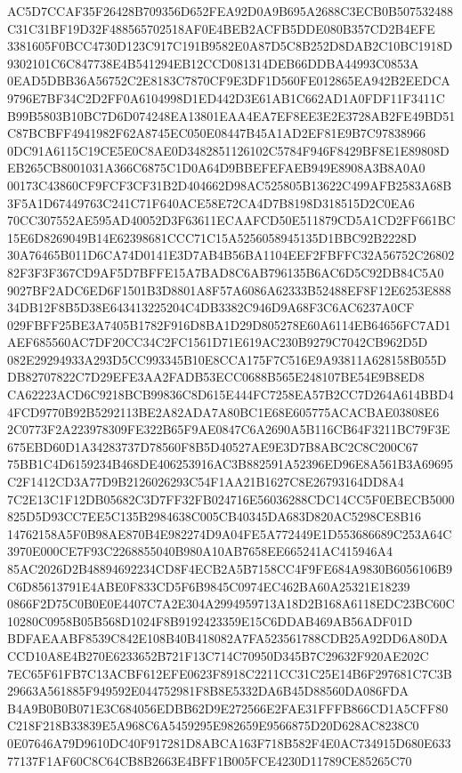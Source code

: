 \documentclass[UTF8,fontset=fandol,zihao=-4,a4paper]{ctexart}
\begin{document}
{{AC5D7CCAF35F26428B709356D652FEA92D0A9B695A2688C3ECB0B507532488C31C31BF19D32F488565702518AF0E4BEB2ACFB5DDE080B357CD2B4EFE
3381605F0BCC4730D123C917C191B9582E0A87D5C8B252D8DAB2C10BC1918D9302101C6C847738E4B541294EB12CCD081314DEB66DDBA44993C0853A
0EAD5DBB36A56752C2E8183C7870CF9E3DF1D560FE012865EA942B2EEDCA9796E7BF34C2D2FF0A6104998D1ED442D3E61AB1C662AD1A0FDF11F3411C
B99B5803B10BC7D6D074248EA13801EAA4EA7EF8EE3E2E3728AB2FE49BD51C87BCBFF4941982F62A8745EC050E08447B45A1AD2EF81E9B7C97838966
0DC91A6115C19CE5E0C8AE0D3482851126102C5784F946F8429BF8E1E89808DEB265CB8001031A366C6875C1D0A64D9BBEFEFAEB949E8908A3B8A0A0
00173C43860CF9FCF3CF31B2D404662D98AC525805B13622C499AFB2583A68B3F5A1D67449763C241C71F640ACE58E72CA4D7B8198D318515D2C0EA6
70CC307552AE595AD40052D3F63611ECAAFCD50E511879CD5A1CD2FF661BC15E6D8269049B14E62398681CCC71C15A5256058945135D1BBC92B2228D
30A76465B011D6CA74D0141E3D7AB4B56BA1104EEF2FBFFC32A56752C2680282F3F3F367CD9AF5D7BFFE15A7BAD8C6AB796135B6AC6D5C92DB84C5A0
9027BF2ADC6ED6F1501B3D8801A8F57A6086A62333B52488EF8F12E6253E88834DB12F8B5D38E643413225204C4DB3382C946D9A68F3C6AC6237A0CF
029FBFF25BE3A7405B1782F916D8BA1D29D805278E60A6114EB64656FC7AD1AEF685560AC7DF20CC34C2FC1561D71E619AC230B9279C7042CB962D5D
082E29294933A293D5CC993345B10E8CCA175F7C516E9A93811A628158B055DDB82707822C7D29EFE3AA2FADB53ECC0688B565E248107BE54E9B8ED8
CA62223ACD6C9218BCB99836C8D615E444FC7258EA57B2CC7D264A614BBD44FCD9770B92B5292113BE2A82ADA7A80BC1E68E605775ACACBAE03808E6
2C0773F2A223978309FE322B65F9AE0847C6A2690A5B116CB64F3211BC79F3E675EBD60D1A34283737D78560F8B5D40527AE9E3D7B8ABC2C8C200C67
75BB1C4D6159234B468DE406253916AC3B882591A52396ED96E8A561B3A69695C2F1412CD3A77D9B2126026293C54F1AA21B1627C8E26793164DD8A4
7C2E13C1F12DB05682C3D7FF32FB024716E56036288CDC14CC5F0EBECB5000825D5D93CC7EE5C135B2984638C005CB40345DA683D820AC5298CE8B16
14762158A5F0B98AE870B4E982274D9A04FE5A772449E1D553686689C253A64C3970E000CE7F93C2268855040B980A10AB7658EE665241AC415946A4
85AC2026D2B48894692234CD8F4ECB2A5B7158CC4F9FE684A9830B6056106B9C6D85613791E4ABE0F833CD5F6B9845C0974EC462BA60A25321E18239
0866F2D75C0B0E0E4407C7A2E304A2994959713A18D2B168A6118EDC23BC60C10280C0958B05B568D1024F8B9192423359E15C6DDAB469AB56ADF01D
BDFAEAABF8539C842E108B40B418082A7FA523561788CDB25A92DD6A80DACCD10A8E4B270E6233652B721F13C714C70950D345B7C29632F920AE202C
7EC65F61FB7C13ACBF612EFE0623F8918C2211CC31C25E14B6F297681C7C3B29663A561885F949592E044752981F8B8E5332DA6B45D88560DA086FDA
B4A9B0B0B071E3C684056EDBB62D9E272566E2FAE31FFFB866CD1A5CFF80C218F218B33839E5A968C6A5459295E982659E9566875D20D628AC8238C0
0E07646A79D9610DC40F917281D8ABCA163F718B582F4E0AC734915D680E63377137F1AF60C8C64CB8B2663E4BFF1B005FCE4230D11789CE85265C70
}}
\end{document}
